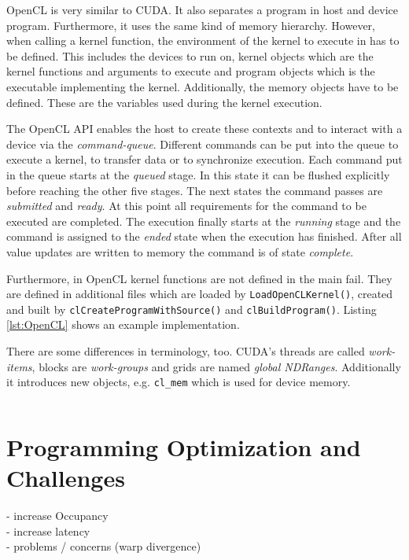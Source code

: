 \documentclass[a4paper,12pt]{llncs}
\numberwithin{equation}{section}
\begin{document}
  OpenCL is very similar to CUDA.
  It also separates a program in host and device program.
  Furthermore, it uses the same kind of memory hierarchy.
  However, when calling a kernel function, the environment of the kernel to execute in has to be defined.
  This includes the devices to run on, kernel objects which are the kernel functions and arguments to execute and program objects which is the executable implementing the kernel.
  Additionally, the memory objects have to be defined.
  These are the variables used during the kernel execution.~\cite{Khronos.2019}
  
  The OpenCL API enables the host to create these contexts and to interact with a device via the \textit{command-queue}.
  Different commands can be put into the queue to execute a kernel, to transfer data or to synchronize execution.
  Each command put in the queue starts at the \textit{queued} stage.
  In this state it can be flushed explicitly before reaching the other five stages.
  The next states the command passes are \textit{submitted} and \textit{ready}.
  At this point all requirements for the command to be executed are completed.
  The execution finally starts at the \textit{running} stage and the command is assigned to the \textit{ended} state when the execution has finished.
  After all value updates are written to memory the command is of state \textit{complete}.
  
  Furthermore, in OpenCL kernel functions are not defined in the main fail.
  They are defined in additional files which are loaded by \texttt{LoadOpenCLKernel()}, created and built by \texttt{clCreateProgramWithSource()} and \texttt{clBuildProgram()}.
  Listing \ref{lst:OpenCL} shows an example implementation.
    
  There are some differences in terminology, too.
  CUDA's threads are called \textit{work-items}, blocks are \textit{work-groups} and grids are named \textit{global NDRanges}.
  Additionally it introduces new objects, e.g. \texttt{cl\_mem} which is used for device memory.
  
  
\begin{lstlisting}[style=cpp,caption={Kernel Function of Matrix Multiplication},label={lst:OpenCL},numbers=left]

\end{lstlisting}

\section{Programming Optimization and Challenges}
  - increase Occupancy\\
  - increase latency\\
  - problems / concerns (warp divergence)\\
\end{document}
